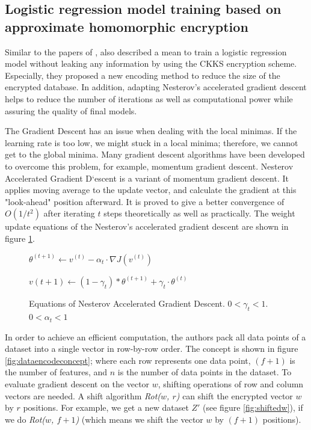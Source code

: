     \subsection{Logistic regression model training based on approximate homomorphic encryption}
    Similar to the papers of \cite{MiranKim2018}, \cite{Kim2018} also described a mean to train a logistic regression model without leaking any information by using the CKKS encryption scheme. Especially, they proposed a new encoding method to reduce the size of the encrypted database. In addition, adapting Nesterov's accelerated gradient descent helps to reduce the number of iterations as well as computational power while assuring the quality of final models.
    
    The Gradient Descent has an issue when dealing with the local minimas. If the learning rate is too low, we might stuck in a local minima; therefore, we cannot get to the global minima. Many gradient descent algorithms have been developed to overcome this problem, for example, momentum gradient descent. Nesterov Accelerated Gradient D`escent \cite{Nesterov} is a variant of momentum gradient descent. It applies moving average to the update vector, and calculate the gradient at this "look-ahead" position afterward. It is proved to give a better convergence of $O(1/t^2)$ after iterating $t$ steps theoretically as well as practically. The weight update equations of the Nesterov's accelerated gradient descent are shown in figure \ref{fig:nesteroveq}.
    
    \begin{figure}[ht]
        \centering
        $\theta^{(t+1)} \xleftarrow[]{} v^{(t)} - \alpha_t \cdot \nabla{J}(v^{(t)})$
    
        $v{(t+1)} \xleftarrow[]{} (1 - \gamma_t) * \theta^{(t+1)} + \gamma_t \cdot \theta^{(t)}$
        \caption{Equations of Nesterov Accelerated Gradient Descent. $0 < \gamma_t < 1$. $0 < \alpha_t < 1$}
        \label{fig:nesteroveq}
    \end{figure}
    
    In order to achieve an efficient computation, the authors pack all data points of a dataset into a single vector in row-by-row order. The concept is shown in figure \ref{fig:dataencodeconcept}; where each row represents one data point, $(f+1)$ is the number of features, and $n$ is the number of data points in the dataset. To evaluate gradient descent on the vector $w$, shifting operations of row and column vectors are needed. A shift algorithm \textit{Rot($w$, $r$)} can shift the encrypted vector $w$ by $r$ positions. For example, we get a new dataset $Z'$ (see figure \ref{fig:shiftedw}), if we do \textit{Rot($w$, $f+1$)} (which means we shift the vector $w$ by $(f+1)$ positions).
    
